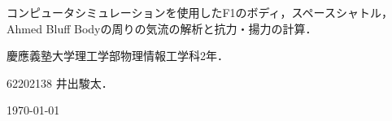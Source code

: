 \documentclass[main]{subfiles}
\begin{document}
\begin{titlepage}
    \centering
    \Large
    コンピュータシミュレーションを使用したF1のボディ，スペースシャトル，Ahmed Bluff Bodyの周りの気流の解析と抗力・揚力の計算．

    \normalsize
    \vspace{10pt}
    慶應義塾大学理工学部物理情報工学科2年．

    62202138 井出駿太．

    \vspace{10pt}
    \today

\end{titlepage}
\end{document}
